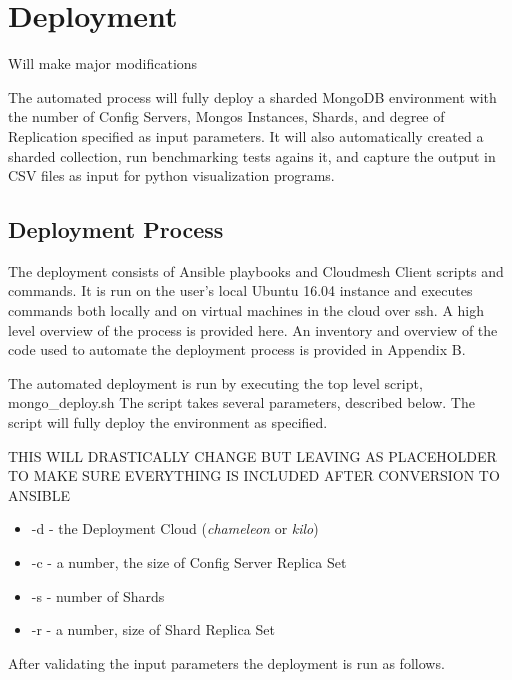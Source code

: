 \documentclass[9pt,twocolumn,twoside]{styles/osajnl}
\begin{document}
\section{Deployment}

Will make major modifications

The automated process will fully deploy a sharded MongoDB environment with the number of Config Servers, Mongos Instances, Shards, and degree of Replication specified as input parameters.  It will also automatically created a sharded collection, run benchmarking tests agains it, and capture the output in CSV files as input for python visualization programs.

\subsection{Deployment Process}

The deployment consists of Ansible playbooks and Cloudmesh Client scripts and commands.  It is run on the user's local Ubuntu 16.04 instance and executes commands both locally and on virtual machines in the cloud over ssh.  A high level overview of the process is provided here.  An inventory and overview of the code used to automate the deployment process is provided in Appendix B.

The automated deployment is run by executing the top level script, mongo\_deploy.sh \cite{www-mongoDeploy} \cite{www-shardLocal} The script takes several parameters, described below.  The script will fully deploy the environment as specified.

THIS WILL DRASTICALLY CHANGE BUT LEAVING AS PLACEHOLDER TO MAKE SURE EVERYTHING IS INCLUDED AFTER CONVERSION TO ANSIBLE

\vspace{-\topsep}
\begin{itemize}
\item -d - the Deployment Cloud (\emph{chameleon} or \emph{kilo})
\item -c - a number, the size of Config Server Replica Set
\item -s - number of Shards
\item -r - a number, size of Shard Replica Set
\end{itemize}
\vspace{-\topsep}

After validating the input parameters the deployment is run as follows.
\end{document}
